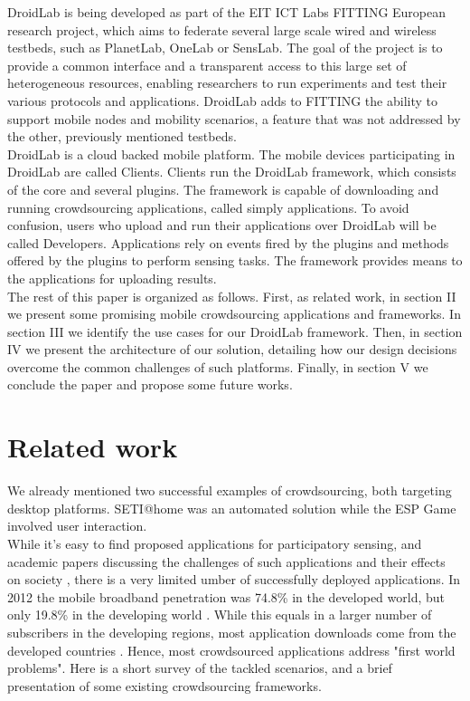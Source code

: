 \documentclass[conference,letterpaper]{IEEEtran}
\begin{document}
DroidLab is being developed as part of the EIT ICT Labs FITTING European research project, which aims to federate several large scale wired and wireless testbeds, such as PlanetLab, OneLab or SensLab. The goal of the project is to provide a common interface and a transparent access to this large set of heterogeneous resources, enabling researchers to run experiments and test their various protocols and applications. DroidLab adds to FITTING the ability to support mobile nodes and mobility scenarios, a feature that was not addressed by the other, previously mentioned testbeds.\\
\indent DroidLab is a cloud backed mobile platform. The mobile devices participating in DroidLab are called Clients. Clients run the DroidLab framework, which consists of the core and several plugins. The framework is capable of downloading and running crowdsourcing applications, called simply applications. To avoid confusion, users who upload and run their applications over DroidLab will be called Developers. Applications rely on events fired by the plugins and methods offered by the plugins to perform sensing tasks. The framework provides means to the applications for uploading results.\\
\indent The rest of this paper is organized as follows. First, as related work, in section II we present some  promising mobile crowdsourcing applications and frameworks. In section III we  identify the use cases for our DroidLab framework. Then, in section IV we present the architecture of our solution, detailing how our design decisions overcome the common challenges of such platforms. Finally, in section V we conclude the paper and propose some future works.
\section{Related work}
\label{sec:related_work}
We already mentioned two successful examples of crowdsourcing, both targeting desktop platforms. SETI@home was an automated solution while the ESP Game involved user interaction.\\
\indent While it's easy to find proposed applications for participatory sensing, and academic papers discussing the challenges of such applications and their effects on society \cite{Estrin2010}, there is a very limited umber of successfully deployed applications. In 2012 the mobile broadband penetration was  74.8\% in the developed world, but only 19.8\% in the developing world \cite{MobileStats}. While this equals in a larger number of subscribers in the developing regions, most application downloads come from the developed countries \cite{AppDownloads}. Hence, most crowdsourced applications address "first world problems". Here is a short survey of the tackled scenarios, and a brief presentation of some existing crowdsourcing frameworks.
\end{document}
